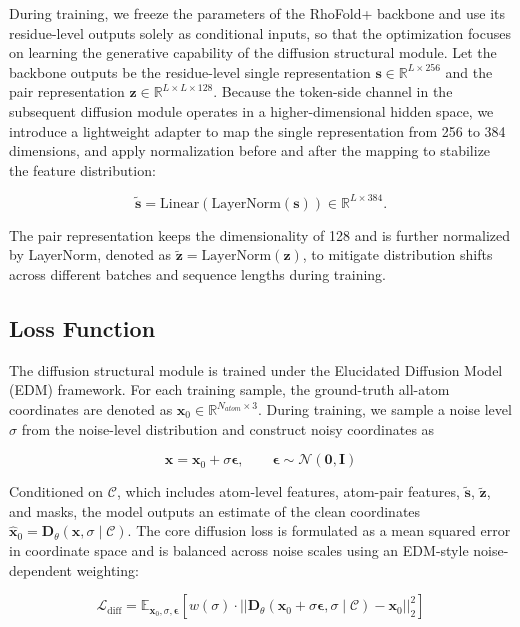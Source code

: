 During training, we freeze the parameters of the RhoFold+ backbone and use its residue-level outputs solely as conditional inputs, so that the optimization focuses on learning the generative capability of the diffusion structural module. Let the backbone outputs be the residue-level single representation $\mathbf{s} \in \mathbb{R}^{L \times 256}$ and the pair representation $\mathbf{z} \in \mathbb{R}^{L \times L \times 128}$. Because the token-side channel in the subsequent diffusion module operates in a higher-dimensional hidden space, we introduce a lightweight adapter to map the single representation from 256 to 384 dimensions, and apply normalization before and after the mapping to stabilize the feature distribution:

$$
\tilde{\mathbf{s}} = \mathrm{Linear}\left(\mathrm{LayerNorm}(\mathbf{s})\right) \in \mathbb{R}^{L \times 384}.  
$$

The pair representation keeps the dimensionality of 128 and is further normalized by LayerNorm, denoted as $\tilde{\mathbf{z}} = \mathrm{LayerNorm}(\mathbf{z})$, to mitigate distribution shifts across different batches and sequence lengths during training.

\subsection{Loss Function}

The diffusion structural module is trained under the Elucidated Diffusion Model (EDM) framework. For each training sample, the ground-truth all-atom coordinates are denoted as $\mathbf{x}_0 \in \mathbb{R}^{N_{atom} \times 3}$. During training, we sample a noise level $\sigma$ from the noise-level distribution and construct noisy coordinates as

$$
\mathbf{x} = \mathbf{x}_0 + \sigma \boldsymbol{\epsilon}, \qquad \boldsymbol{\epsilon} \sim \mathcal{N}(\mathbf{0}, \mathbf{I})
$$

Conditioned on $\mathcal{C}$, which includes atom-level features, atom-pair features, $\tilde{\mathbf{s}}$, $\tilde{\mathbf{z}}$, and masks, the model outputs an estimate of the clean coordinates $\hat{\mathbf{x}}_0 = \mathbf{D}_\theta(\mathbf{x}, \sigma \mid \mathcal{C})$. The core diffusion loss is formulated as a mean squared error in coordinate space and is balanced across noise scales using an EDM-style noise-dependent weighting:

$$
\mathcal{L}_{\mathrm{diff}}
=
\mathbb{E}_{\mathbf{x}_0, \sigma, \boldsymbol{\epsilon}}  
\left[  
w(\sigma)  \cdot
\left|| 
\mathbf{D}_\theta(\mathbf{x}_0 + \sigma \boldsymbol{\epsilon}, \sigma \mid \mathcal{C})
-
\mathbf{x}_0  
\right||_2^2  
\right]
$$

